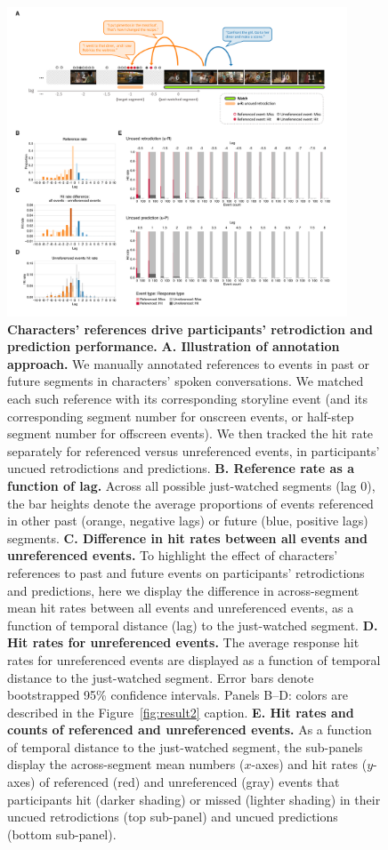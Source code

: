 \documentclass[10pt]{article}
\begin{document}
\begin{figure}[tp]
  \centering
  \includegraphics[width=0.9\textwidth]{results3}
  \caption{\textbf{Characters' references drive participants' retrodiction and prediction performance.}  \textbf{A. Illustration of annotation approach.}  We manually annotated references to events in past or future segments in characters' spoken conversations.  We matched each such reference with its corresponding storyline event (and its corresponding segment number for onscreen events, or half-step segment number for offscreen events).  We then tracked the hit rate separately for referenced versus unreferenced events, in participants' uncued retrodictions and predictions.  \textbf{B. Reference rate as a function of lag.}  Across all possible just-watched segments (lag 0), the bar heights denote the average proportions of events referenced in other past (orange, negative lags) or future (blue, positive lags) segments.  \textbf{C. Difference in hit rates between all events and unreferenced events.}  To highlight the effect of characters' references to past and future events on participants' retrodictions and predictions, here we display the difference in across-segment mean hit rates between all events and unreferenced events, as a function of temporal distance (lag) to the just-watched segment.  \textbf{D. Hit rates for unreferenced events.}  The average response hit rates for unreferenced events are displayed as a function of temporal distance to the just-watched segment.  Error bars denote bootstrapped 95\% confidence intervals.  Panels B--D: colors are described in the Figure~\ref{fig:result2} caption.  \textbf{E.  Hit rates and counts of referenced and unreferenced events.}  As a function of temporal distance to the just-watched segment, the sub-panels display the across-segment mean numbers ($x$-axes) and hit rates ($y$-axes) of referenced (red) and unreferenced (gray) events that participants hit (darker shading) or missed (lighter shading) in their uncued retrodictions (top sub-panel) and uncued predictions (bottom sub-panel).}
  \label{fig:result3}
\end{figure}
\end{document}
